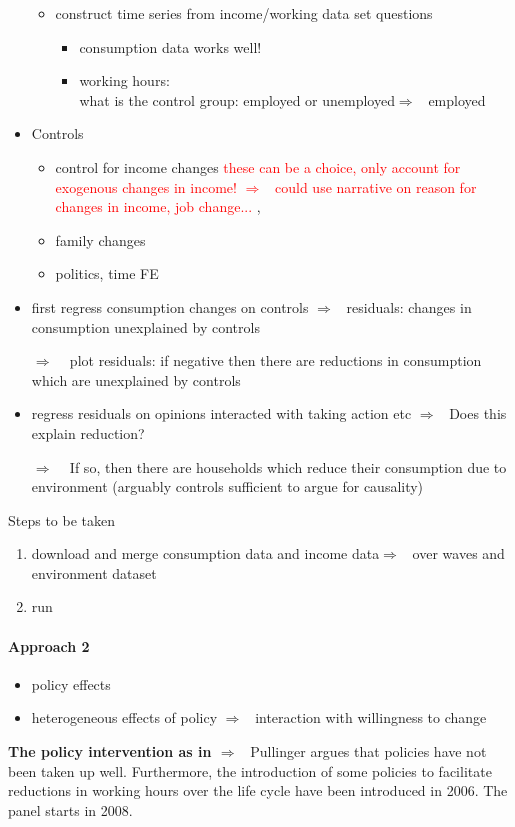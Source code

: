 \documentclass[12pt]{article}
\newcommand{\ar}{$\Rightarrow$ \ }
\newcommand{\tr}[1]{\textcolor{red}{#1}}
\begin{document}
\begin{itemize}
\begin{itemize}
\item construct time series from income/working data set questions
\begin{itemize}
\item consumption data works well! 
\item working hours: \\ what is the control group: employed or unemployed\ar employed
\end{itemize}
	\end{itemize}
\item Controls
\begin{itemize}
\item control for income changes \tr{these can be a choice, only account for exogenous changes in income! \ar could use narrative on reason for changes in income, job change... }, 
\item family changes
\item  politics, time FE
\end{itemize}	

\item first regress consumption changes on controls \ar residuals: changes in consumption unexplained by controls
\item[\ar] plot residuals: if negative then there are reductions in consumption which are unexplained by controls
\item regress residuals on opinions interacted with taking action etc \ar Does this explain reduction?
\item[\ar] If so, then there are households which reduce their consumption due to environment (arguably controls sufficient to argue for causality)
\end{itemize}

Steps to be taken
\begin{enumerate}
\item download and merge consumption data and income data\ar over waves and environment dataset
\item run 
\end{enumerate}

\paragraph{Approach 2}
\begin{itemize}
\item policy effects
\item heterogeneous effects of policy \ar interaction with willingness to change
\end{itemize}
\textbf{The policy intervention as in \cite{Pullinger2014WorkingDesign}} \ar Pullinger argues that policies have not been taken up well. Furthermore, the introduction of some policies to facilitate reductions in working hours over the life cycle have been introduced in 2006. The panel starts in 2008. 
\end{document}
